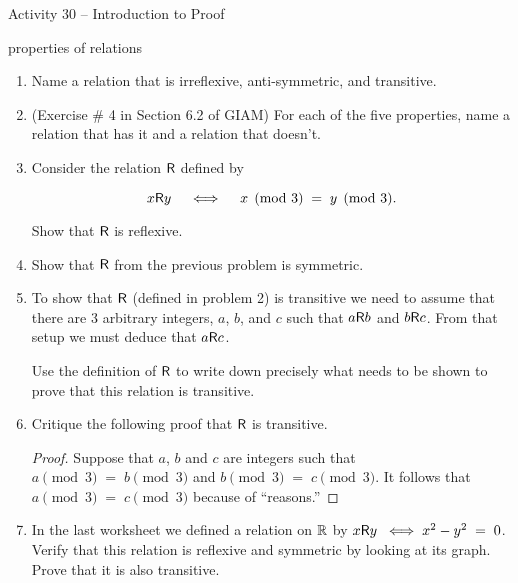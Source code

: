 \documentclass{amsart}
\begin{document}
\thispagestyle{empty}

\centerline{\Large Activity 30 -- Introduction to Proof}
\centerline{\large properties of relations}

\bigskip
\Large


\begin{enumerate}
	
\item Name a relation that is irreflexive, anti-symmetric, and transitive.

\vfill

\item (Exercise \# 4 in Section 6.2 of GIAM) For each of the five properties, name a relation that has it and a relation that doesn’t.

\vfill

\item Consider the relation $\mbox{\textsf R}$ defined by 

\[ x \mbox{\textsf R} y \quad \iff \quad x \pmod{3} \; = \; y \pmod{3} . \]

Show that $\mbox{\textsf R}$ is reflexive.

\vfill

\newpage

\item Show that $\mbox{\textsf R}$ from the previous problem is symmetric.

\vfill

\item To show that $\mbox{\textsf R}$ (defined in problem 2) is transitive we need to assume that there are 3 arbitrary integers, $a$, $b$, and $c$ such that $a \mbox{\textsf R} b$ and $b \mbox{\textsf R} c$.  From that setup we must deduce that $a \mbox{\textsf R} c$.

Use the definition of $\mbox{\textsf R}$ to write down precisely what needs to be shown to prove that this relation is transitive.

\vfill 

\newpage

\item Critique the following proof that $\mbox{\textsf R}$ is transitive.

\begin{proof} Suppose that $a$, $b$ and $c$ are integers such that 
 $a \pmod{3} \; = \; b \pmod{3}$ and $ b \pmod{3} \; = \; c \pmod{3}$.  It follows that $ a \pmod{3} \; = \; c \pmod{3}$ because of ``reasons.''
\end{proof}

\vfill


\item In the last worksheet we defined a relation on ${\mathbb R}$ by $x \mbox{\textsf R} y \; \iff x^2 - y^2 \; = \; 0$.  Verify that this relation is reflexive and symmetric by looking at its graph.  Prove that it is also transitive. 


\end{enumerate}
\end{document}
